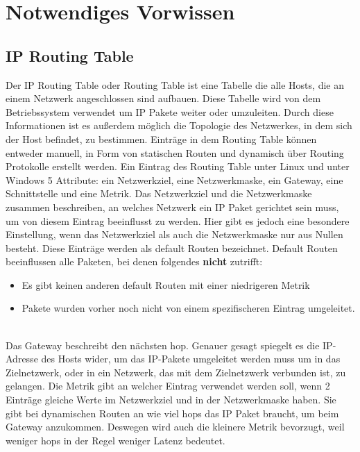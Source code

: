 \chapter{Notwendiges Vorwissen}
\label{cha:Notwendiges Vorwissen}

\section{IP Routing Table}
Der IP Routing Table oder Routing Table ist eine Tabelle die alle Hosts, die an einem Netzwerk angeschlossen sind aufbauen. Diese Tabelle wird von dem Betriebssystem verwendet um IP Pakete weiter oder umzuleiten. Durch diese Informationen ist es außerdem möglich die Topologie des Netzwerkes, in dem sich der Host befindet, zu bestimmen.
\newline
\newline
Einträge in dem Routing Table können entweder manuell, in Form von statischen Routen und dynamisch über Routing Protokolle erstellt werden.
\newline
\newline
Ein Eintrag des Routing Table unter Linux und unter Windows 5 Attribute: ein Netzwerkziel, eine Netzwerkmaske, ein Gateway, eine Schnittstelle und eine Metrik.
\newline
\newline
Das Netzwerkziel und die Netzwerkmaske zusammen beschreiben, an welches Netzwerk ein IP Paket gerichtet sein muss, um von diesem Eintrag beeinflusst zu werden. Hier gibt es jedoch eine besondere Einstellung, wenn das Netzwerkziel als auch die Netzwerkmaske nur aus Nullen besteht. Diese Einträge werden als default Routen bezeichnet. Default Routen beeinflussen alle Paketen, bei denen folgendes \textbf{nicht} zutrifft:
\newline
\begin{itemize}
    \item Es gibt keinen anderen default Routen mit einer niedrigeren Metrik
    \item Pakete wurden vorher noch nicht von einem spezifischeren Eintrag umgeleitet.
\end{itemize}
\ \\
Das Gateway beschreibt den nächsten hop. Genauer gesagt spiegelt es die IP-Adresse des Hosts wider, um das IP-Pakete umgeleitet werden muss um in das Zielnetzwerk, oder in ein Netzwerk, das mit dem Zielnetzwerk verbunden ist, zu gelangen.
\newline
\newline
Die Metrik gibt an welcher Eintrag verwendet werden soll, wenn 2 Einträge gleiche Werte im Netzwerkziel und in der Netzwerkmaske haben. Sie gibt bei dynamischen Routen an wie viel hops das IP Paket braucht, um beim Gateway anzukommen. Deswegen wird auch die kleinere Metrik bevorzugt, weil weniger hops in der Regel weniger Latenz bedeutet.
